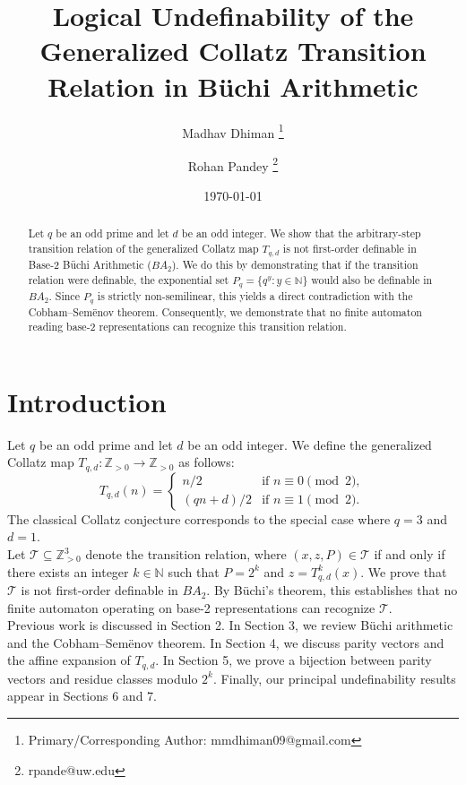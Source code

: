 \documentclass[11pt]{article}
\title{Logical Undefinability of the Generalized Collatz Transition Relation in B\"uchi Arithmetic}
\author{Madhav Dhiman \thanks{Primary/Corresponding Author: mmdhiman09@gmail.com} \and Rohan Pandey \thanks{rpande@uw.edu}}
\date{\today}
\begin{document}
\maketitle

\begin{abstract}
Let $q$ be an odd prime and let $d$ be an odd integer. We show that the arbitrary-step transition relation of the generalized Collatz map $T_{q,d}$ is not first-order definable in Base-2 B\"uchi Arithmetic ($BA_2$). We do this by demonstrating that if the transition relation were definable, the exponential set $P_q = \{q^y : y \in \mathbb{N}\}$ would also be definable in $BA_2$. Since $P_q$ is strictly non-semilinear, this yields a direct contradiction with the Cobham--Sem\"enov theorem. Consequently, we demonstrate that no finite automaton reading base-2 representations can recognize this transition relation.
\end{abstract}

\section{Introduction}

Let $q$ be an odd prime and let $d$ be an odd integer. We define the generalized Collatz map $T_{q,d} : \mathbb{Z}_{>0} \rightarrow \mathbb{Z}_{>0}$ as follows:
\[
T_{q,d}(n) = 
\begin{cases}
n/2 & \text{if } n \equiv 0 \pmod 2, \\
(qn+d)/2 & \text{if } n \equiv 1 \pmod 2.
\end{cases}
\]
The classical Collatz conjecture corresponds to the special case where $q = 3$ and $d = 1$. \\

 Let $\mathcal{T} \subseteq \mathbb{Z}_{>0}^3$ denote the transition relation, where $(x, z, P) \in \mathcal{T}$ if and only if there exists an integer $k \in \mathbb{N}$ such that $P = 2^k$ and $z = T_{q,d}^k(x)$. We prove that $\mathcal{T}$ is not first-order definable in $BA_2$. By B\"uchi's theorem, this establishes that no finite automaton operating on base-2 representations can recognize $\mathcal{T}$. \\

Previous work is discussed in Section 2. In Section 3, we review B\"uchi arithmetic and the Cobham--Sem\"enov theorem. In Section 4, we discuss parity vectors and the affine expansion of $T_{q,d}$. In Section 5, we prove a bijection between parity vectors and residue classes modulo $2^k$. Finally, our principal undefinability results appear in Sections 6 and 7. \\
\end{document}
